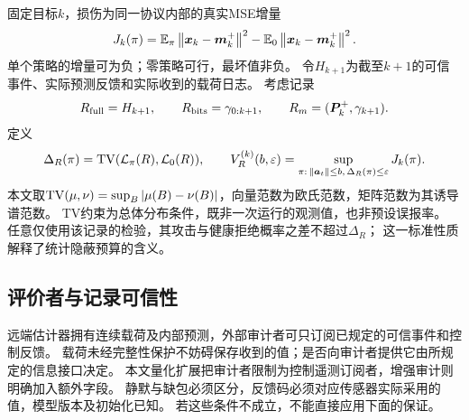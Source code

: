 固定目标$k$，损伤为同一协议内部的真实MSE增量
\begin{equation}
J_k(\pi)=\mathbb E_\pi\left\|{\bm{x}}_k-{\bm{m}}_k^+\right\|^2-\mathbb E_0\left\|{\bm{x}}_k-{\bm{m}}_k^+\right\|^2.
\label{eq:damage}
\end{equation}
单个策略的增量可为负；零策略可行，最坏值非负。
令$H_{k+1}$为截至$k+1$的可信事件、实际预测反馈和实际收到的载荷日志。
考虑记录
\[
R_{\rm full}=H_{k+1},\qquad
R_{\rm bits}=\gamma_{0:k+1},\qquad
R_m=({\bm{P}}_k^+,\gamma_{k+1}).
\]
定义
\begin{equation}
\Delta_R(\pi)=\operatorname{TV}(\mathcal L_\pi(R),\mathcal L_0(R)),\qquad
V_R^{(k)}(b,\varepsilon)=
\sup_{\pi:\,\left\|{\bm{a}}_t\right\|\le b,\,\Delta_R(\pi)\le\varepsilon}J_k(\pi).
\label{eq:value}
\end{equation}
本文取$\operatorname{TV}(\mu,\nu)=\sup_B|\mu(B)-\nu(B)|$，向量范数为欧氏范数，矩阵范数为其诱导谱范数。
TV约束为总体分布条件，既非一次运行的观测值，也非预设误报率。
任意仅使用该记录的检验，其攻击与健康拒绝概率之差不超过$\Delta_R$；
这一标准性质解释了统计隐蔽预算的含义。

\subsection{评价者与记录可信性}
远端估计器拥有连续载荷及内部预测，外部审计者可只订阅已规定的可信事件和控制反馈。
载荷未经完整性保护不妨碍保存收到的值；是否向审计者提供它由所规定的信息接口决定。
本文量化扩展把审计者限制为控制遥测订阅者，增强审计则明确加入额外字段。
静默与缺包必须区分，反馈码必须对应传感器实际采用的值，模型版本及初始化已知。
若这些条件不成立，不能直接应用下面的保证。

